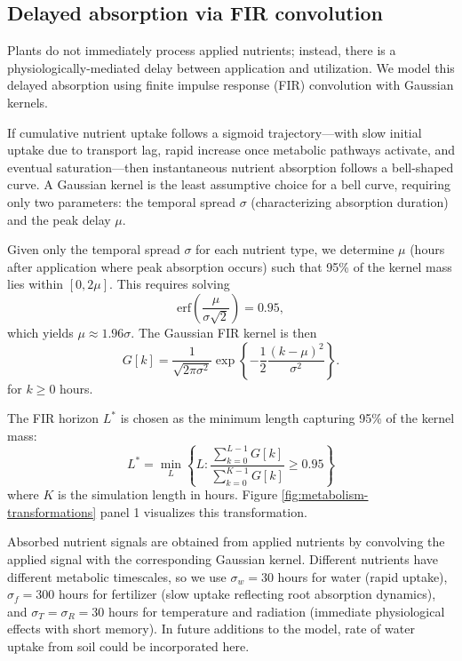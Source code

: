 \documentclass[preprint,12pt]{elsarticle}
\newcommand{\df}[2]{\displaystyle\frac{#1}{#2}}
\begin{document}
\subsection{Delayed absorption via FIR convolution}\label{subsec:fir-conv}

Plants do not immediately process applied nutrients; instead, there is a physiologically-mediated delay between application and utilization. We model this delayed absorption using finite impulse response (FIR) convolution with Gaussian kernels.

If cumulative nutrient uptake follows a sigmoid trajectory---with slow initial uptake due to transport lag, rapid increase once metabolic pathways activate, and eventual saturation---then instantaneous nutrient absorption follows a bell-shaped curve. A Gaussian kernel is the least assumptive choice for a bell curve, requiring only two parameters: the temporal spread $\sigma$ (characterizing absorption duration) and the peak delay $\mu$.

Given only the temporal spread $\sigma$ for each nutrient type, we determine $\mu$ (hours after application where peak absorption occurs) such that 95\% of the kernel mass lies within $[0, 2\mu]$. This requires solving
\begin{equation}
\text{erf}\left(\df{\mu}{\sigma\sqrt{2}}\right) = 0.95,
\label{eqn:erf}
\end{equation}
which yields $\mu \approx 1.96\sigma$. The Gaussian FIR kernel is then
\begin{equation}
G[k] = \df{1}{\sqrt{2\pi\sigma^{2}}} \exp\left\{ -\df{1}{2}\df{(k-\mu)^{2}}{\sigma^{2}} \right\}.
\label{eqn:gaussian-kernel}
\end{equation}
for $k\geq 0$ hours.

The FIR horizon $L^{*}$ is chosen as the minimum length capturing 95\% of the kernel mass:
\begin{equation}
L^{*} = \min_{L} \left\{ L : \df{\sum_{k=0}^{L-1} G[k]}{\sum_{k=0}^{K-1} G[k]} \geq 0.95 \right\}
\label{eqn:L-star}
\end{equation}
where $K$ is the simulation length in hours. Figure \ref{fig:metabolism-transformations} panel 1 visualizes this transformation.

Absorbed nutrient signals are obtained from applied nutrients by convolving the applied signal with the corresponding Gaussian kernel. Different nutrients have different metabolic timescales, so we use $\sigma_{w} = 30$ hours for water (rapid uptake), $\sigma_{f} = 300$ hours for fertilizer (slow uptake reflecting root absorption dynamics), and $\sigma_{T} = \sigma_{R} = 30$ hours for temperature and radiation (immediate physiological effects with short memory). In future additions to the model, rate of water uptake from soil could be incorporated here.
\end{document}
